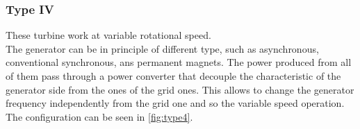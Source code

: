 \subsubsection{Type IV}
These turbine work at variable rotational speed. \\
The generator can be in principle of different type, such as asynchronous, conventional synchronous, ans permanent magnets. The power produced from all of them pass through a power converter that decouple the characteristic of the generator side from the ones of the grid ones. This allows to change the generator frequency independently from the grid one and so the variable speed operation. 
The configuration can be seen in \autoref{fig:type4}.



